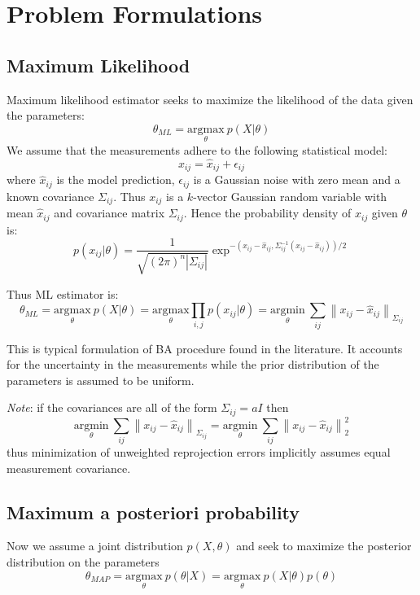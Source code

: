 \documentclass[10pt]{article}         %
\begin{document}
\section{Problem Formulations}

\subsection{Maximum Likelihood}

Maximum likelihood estimator seeks to maximize the likelihood of the
data given the parameters:
\[
\theta_{ML} = \underset{\theta}{\text{argmax}}\ p(X|\theta)
\]
We assume that the measurements adhere to the following statistical
model:
\[
x_{ij} = \hat{x}_{ij}+\epsilon_{ij}
\]
where $\hat{x}_{ij}$ is the model prediction, $\epsilon_{ij}$ is a
Gaussian noise with zero mean and a known covariance
$\Sigma_{ij}$. Thus $x_{ij}$ is a $k$-vector Gaussian random variable
with mean $\hat{x}_{ij}$ and covariance matrix $\Sigma_{ij}$. Hence
the probability density of $x_{ij}$ given $\theta$ is:
\[
p(x_{ij}|\theta)=\frac{1}{\sqrt{(2\pi)^n\left|\Sigma_{ij}\right|}}\exp^{-(x_{ij}-\hat{x}_{ij},\Sigma_{ij}^{-1}(x_{ij}-\hat{x}_{ij}))/2}
\]

Thus ML estimator is:
\begin{equation}\label{eq:ml}
\theta_{ML} = \underset{\theta}{\text{argmax}}\ p(X|\theta) =
\underset{\theta}{\text{argmax}} \prod_{i,j} p(x_{ij}|\theta)
=\underset{\theta}{\text{argmin}}\ \sum_{ij}\left\| x_{ij}-\hat{x}_{ij}\right\|_{\Sigma_{ij}}
\end{equation}

This is typical formulation of BA procedure found in the
literature. It accounts for the uncertainty in the measurements while
the prior distribution of the parameters is assumed to be uniform.

\emph{Note}: if the covariances are all of the form $\Sigma_{ij}=a I$
then
\[
\underset{\theta}{\text{argmin}}\ \sum_{ij}\left\|
  x_{ij}-\hat{x}_{ij}\right\|_{\Sigma_{ij}} = \underset{\theta}{\text{argmin}}\ \sum_{ij}\left\|
  x_{ij}-\hat{x}_{ij}\right\|_2^2
\]
thus minimization of unweighted reprojection errors implicitly assumes
equal measurement covariance.

\subsection{Maximum a posteriori probability}

Now we assume a joint distribution $p(X,\theta)$ and seek to maximize
the posterior distribution on the parameters
\[
\theta_{MAP} = \underset{\theta}{\text{argmax}}\ p(\theta|X)= \underset{\theta}{\text{argmax}}\ p(X|\theta)p(\theta)
\]
\end{document}
